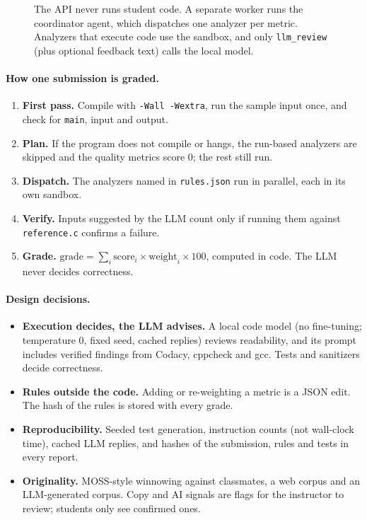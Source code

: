 \documentclass[11pt,a4paper]{article}
\begin{document}
\begin{figure}[H]
\caption{The API never runs student code. A separate worker runs the coordinator agent, which
dispatches one analyzer per metric. Analyzers that execute code use the sandbox, and only
\texttt{llm\_review} (plus optional feedback text) calls the local model.}
\end{figure}

\paragraph{How one submission is graded.}
\begin{enumerate}
  \item \textbf{First pass.} Compile with \texttt{-Wall -Wextra}, run the sample input once, and check for \texttt{main}, input and output.
  \item \textbf{Plan.} If the program does not compile or hangs, the run-based analyzers are skipped and the quality metrics score 0; the rest still run.
  \item \textbf{Dispatch.} The analyzers named in \texttt{rules.json} run in parallel, each in its own sandbox.
  \item \textbf{Verify.} Inputs suggested by the LLM count only if running them against \texttt{reference.c} confirms a failure.
  \item \textbf{Grade.} $\text{grade}=\sum_i \text{score}_i\times\text{weight}_i\times 100$, computed in code. The LLM never decides correctness.
\end{enumerate}

\paragraph{Design decisions.}
\begin{itemize}
  \item \textbf{Execution decides, the LLM advises.} A local code model (no fine-tuning; temperature 0, fixed seed, cached replies) reviews readability, and its prompt includes verified findings from Codacy, cppcheck and gcc. Tests and sanitizers decide correctness.
  \item \textbf{Rules outside the code.} Adding or re-weighting a metric is a JSON edit. The hash of the rules is stored with every grade.
  \item \textbf{Reproducibility.} Seeded test generation, instruction counts (not wall-clock time), cached LLM replies, and hashes of the submission, rules and tests in every report.
  \item \textbf{Originality.} MOSS-style winnowing against classmates, a web corpus and an LLM-generated corpus. Copy and AI signals are flags for the instructor to review; students only see confirmed ones.
\end{itemize}
\end{document}
